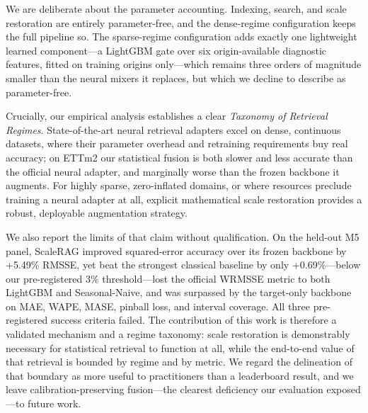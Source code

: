 \documentclass[twocolumn]{svjour3}          %
\begin{document}
We are deliberate about the parameter accounting. Indexing, search, and scale restoration are entirely parameter-free, and the dense-regime configuration keeps the full pipeline so. The sparse-regime configuration adds exactly one lightweight learned component---a LightGBM gate over six origin-available diagnostic features, fitted on training origins only---which remains three orders of magnitude smaller than the neural mixers it replaces, but which we decline to describe as parameter-free.

Crucially, our empirical analysis establishes a clear \textit{Taxonomy of Retrieval Regimes}. State-of-the-art neural retrieval adapters excel on dense, continuous datasets, where their parameter overhead and retraining requirements buy real accuracy; on ETTm2 our statistical fusion is both slower and less accurate than the official neural adapter, and marginally worse than the frozen backbone it augments. For highly sparse, zero-inflated domains, or where resources preclude training a neural adapter at all, explicit mathematical scale restoration provides a robust, deployable augmentation strategy.

We also report the limits of that claim without qualification. On the held-out M5 panel, ScaleRAG improved squared-error accuracy over its frozen backbone by +5.49\% RMSSE, yet beat the strongest classical baseline by only +0.69\%---below our pre-registered 3\% threshold---lost the official WRMSSE metric to both LightGBM and Seasonal-Naive, and was surpassed by the target-only backbone on MAE, WAPE, MASE, pinball loss, and interval coverage. All three pre-registered success criteria failed. The contribution of this work is therefore a validated mechanism and a regime taxonomy: scale restoration is demonstrably necessary for statistical retrieval to function at all, while the end-to-end value of that retrieval is bounded by regime and by metric. We regard the delineation of that boundary as more useful to practitioners than a leaderboard result, and we leave calibration-preserving fusion---the clearest deficiency our evaluation exposed---to future work.




\end{document}
